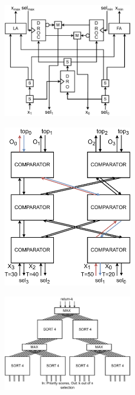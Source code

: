 \documentclass[conference]{IEEEtran}
\begin{document}
\begin{figure}[h!]
  \includegraphics[width=0.5\textwidth]{figures/circuit_comparator.drawio.pdf}
  \caption{}
  \label{fig:comcirc}
\end{figure}

\begin{figure}[h!]
  \includegraphics[width=0.5\textwidth]{figures/sort4.drawio.pdf}
  \caption{}
  \label{fig:sort4}
\end{figure}

\begin{figure}[h!]
  \includegraphics[width=0.5\textwidth]{figures/arbiterk4n16.drawio.pdf}
  \caption{}
  \label{fig:arb16}
\end{figure}
\end{document}
